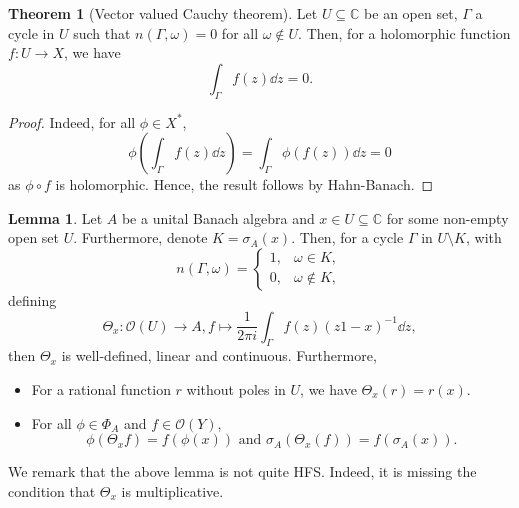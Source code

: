 \documentclass[]{article}
\theoremstyle{definition}
\newtheorem{theorem}{Theorem}
\newtheorem{lemma}{Lemma}[section]
\begin{document}
\begin{theorem}[Vector valued Cauchy theorem]
  Let \(U \subseteq \mathbb{C}\) be an open set, \(\Gamma\) a cycle in \(U\) such that 
  \(n(\Gamma, \omega) = 0\) for all \(\omega \not\in U\). Then, for a holomorphic function 
  \(f : U \to X\), we have 
  \[\int_\Gamma f(z) \dd z = 0.\]
\end{theorem}
\begin{proof}
  Indeed, for all \(\phi \in X^*\), 
  \[\phi\left(\int_\Gamma f(z) \dd z\right) = \int_\Gamma \phi(f(z)) \dd z = 0\]
  as \(\phi \circ f\) is holomorphic. Hence, the result follows by Hahn-Banach.
\end{proof}

\begin{lemma}
  Let \(A\) be a unital Banach algebra and \(x \in U \subseteq \mathbb{C}\) for some non-empty open 
  set \(U\). Furthermore, denote \(K = \sigma_A(x)\). Then, for a cycle \(\Gamma\) in \(U \setminus K\), 
  with 
  \[n(\Gamma, \omega) =
    \begin{cases}
    1, & \omega \in K,\\
    0, & \omega \not\in K,
  \end{cases}\]
  defining 
  \[\Theta_x : \mathcal{O}(U) \to A, f \mapsto \frac{1}{2\pi i} \int_\Gamma f(z)(z1 - x)^{-1} \dd z,\]
  then \(\Theta_x\) is well-defined, linear and continuous. Furthermore, 
  \begin{itemize}
    \item For a rational function \(r\) without poles in \(U\), we have \(\Theta_x(r) = r(x)\). 
    \item For all \(\phi \in \Phi_A\) and \(f \in \mathcal{O}(Y)\), 
      \[\phi(\Theta_x f) = f(\phi(x)) \text{ and } \sigma_A(\Theta_x(f)) = f(\sigma_A(x)).\] 
  \end{itemize}
\end{lemma}

We remark that the above lemma is not quite HFS. Indeed, it is missing the condition that \(\Theta_x\) 
is multiplicative.
\end{document}

